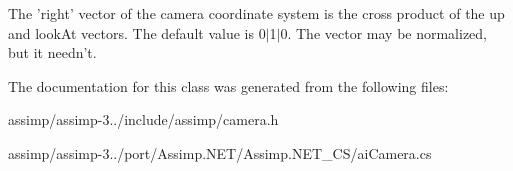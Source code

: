The 'right' vector of the camera coordinate system is the cross product of the up and look\+At vectors. The default value is 0$\vert$1$\vert$0. The vector may be normalized, but it needn't. 

The documentation for this class was generated from the following files\+:\begin{DoxyCompactItemize}
\item 
assimp/assimp-\/3../include/assimp/camera.\+h\item 
assimp/assimp-\/3../port/\+Assimp.\+N\+E\+T/\+Assimp.\+N\+E\+T\+\_\+\+C\+S/ai\+Camera.\+cs\end{DoxyCompactItemize}
